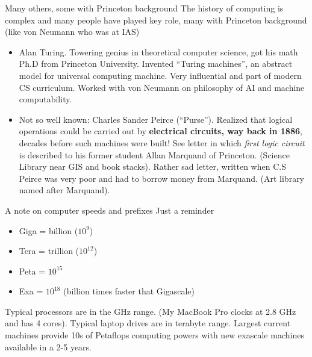 \documentclass[aspectratio=169]{beamer}
\newcommand{\mypause}{}
\begin{document}
\begin{frame}{Many others, some with Princeton background}
  The history of computing is complex and many people have played key
  role, many with Princeton background (like von Neumann who was at
  IAS)
  \begin{itemize}
  \item Alan Turing. Towering genius in theoretical computer science,
    got his math Ph.D from Princeton University. Invented ``Turing
    machines'', an abstract model for universal computing
    machine. Very influential and part of modern CS curriculum. Worked
    with von Neumann on philosophy of AI and machine computability.%
    \mypause%
  \item Not so well known: Charles Sander Peirce (``Purse''). Realized
    that logical operations could be carried out by {\bf electrical
      circuits, way back in 1886}, decades before such machines were
    built! See letter in which \emph{first logic circuit} is described
    to his former student Allan Marquand of Princeton. (Science
    Library near GIS and book stacks). Rather sad letter, written when
    C.S Peirce was very poor and had to borrow money from Marquand. (Art
    library named after Marquand).
  \end{itemize}
\end{frame}

\begin{frame}{A note on computer speeds and prefixes}
  Just a reminder
  \begin{itemize}
  \item Giga = billion ($10^9$)
  \item Tera = trillion ($10^{12}$)
  \item Peta = $10^{15}$
  \item Exa = $10^{18}$ (billion times faster that Gigascale)
  \end{itemize}
  Typical processors are in the GHz range. (My MacBook Pro clocks at
  2.8 GHz and has 4 cores). Typical laptop drives are in terabyte
  range. Largest current machines provide 10s of Petaflops computing
  powers with new exascale machines available in a 2-5 years.
\end{frame}
\end{document}

